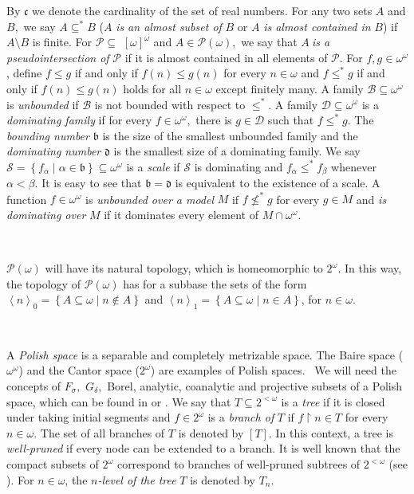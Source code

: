 \documentclass{article}%
\begin{document}
By $\mathfrak{c}$ we denote the cardinality of the set of real numbers. For
any two sets $A$ and $B,$ we say $A\subseteq^{\ast}B$ ($A$ \emph{is an almost
subset of} $B$ or $A$ \emph{is almost contained in }$B$) if $A\setminus B$ is
finite. For $\mathcal{P\subseteq}$ $\left[  \omega\right]  ^{\omega}$ and
$A\in\mathcal{P}\left(  \omega\right)  ,$ we say that $A\ $\emph{is a
pseudointersection of }$\mathcal{P}$ if it is almost contained in all elements
of $\mathcal{P}.$ For $f,g\in\omega^{\omega}$, define $f\leq g$ if and only if
$f\left(  n\right)  \leq g\left(  n\right)  $ for every $n\in\omega$ and
$f\leq^{\ast}g$ if and only if $f\left(  n\right)  \leq g\left(  n\right)  $
holds for all $n\in\omega$ except finitely many. A family $\mathcal{B}%
\subseteq\omega^{\omega}$ is \emph{unbounded }if $\mathcal{B}$ is not bounded
with respect to $\leq^{\ast}.$ A family $\mathcal{D}\subseteq\omega^{\omega}$
is a \emph{dominating family }if for every $f\in\omega^{\omega},$ there is
$g\in\mathcal{D}$ such that $f\leq^{\ast}g.$ The \emph{bounding number
}$\mathfrak{b}$ is the size of the smallest unbounded family and the
\emph{dominating number }$\mathfrak{d}$ is the smallest size of a dominating
family. We say $\mathcal{S}=\left\{  f_{\alpha}\mid\alpha\in\mathfrak{b}%
\right\}  \subseteq\omega^{\omega}$ is a \emph{scale }if $\mathcal{S}$ is
dominating and $f_{\alpha}\leq^{\ast}f_{\beta}$ whenever $\alpha<\beta.$ It is
easy to see that $\mathfrak{b=d}$ is equivalent to the existence of a scale. A
function $f\in\omega^{\omega}$ is \emph{unbounded over a model }$M$ if
$f\nleq^{\ast}g$ for every $g\in M$ and \emph{is dominating over }$M$ if it
dominates every element of $M\cap\omega^{\omega}.$

\qquad\ \ \ \qquad\ \ \ \ 

$\mathcal{P}\left(  \omega\right)  $ will have its natural topology, which is
homeomorphic to $2^{\omega}$. In this way, the topology of $\mathcal{P}\left(
\omega\right)  $ has for a subbase the sets of the form $\left\langle
n\right\rangle _{0}=\left\{  A\subseteq\omega\mid n\notin A\right\}  $ and
$\left\langle n\right\rangle _{1}=\left\{  A\subseteq\omega\mid n\in
A\right\}  $, for $n\in\omega.$

\qquad\ \ \ \ 

A \emph{Polish space }is a separable and completely metrizable space. The
Baire space ($\omega^{\omega}$) and the Cantor space ($2^{\omega}$) are
examples of Polish spaces. \ We will need the concepts of $F_{\sigma},$
$G_{\delta},$ Borel, analytic, coanalytic and projective subsets of a Polish
space, which can be found in \cite{Kechris} or \cite{BorelSrivastava}. We say
that $T\subseteq2^{<\omega}$ is a \emph{tree }if it is closed under taking
initial segments and $f\in2^{\omega}$ is a \emph{branch of }$T$ if
$f\upharpoonright n\in T$ for every $n\in\omega.$ The set of all branches of
$T$ is denoted by $\left[  T\right]  $. In this context, a tree is
\emph{well-pruned }if every node can be extended to a branch. It is well known
that the compact subsets of $2^{\omega}$ correspond to branches of well-pruned
subtrees of $2^{<\omega}$ (see \cite{Kechris}). For $n\in\omega$, the
$n$\emph{-level of the tree} $T$ is denoted by $T_{n}.$
\end{document}

